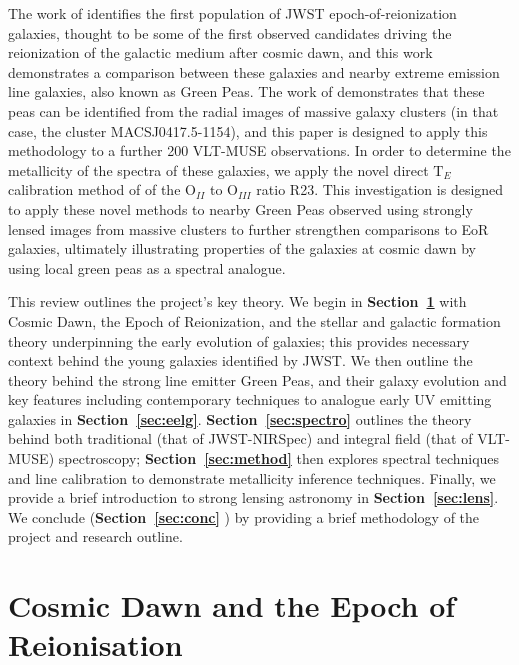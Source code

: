\documentclass[fleqn,usenatbib]{mnras}
\begin{document}
The work of \cite{Rhoads} identifies the first population of JWST epoch-of-reionization galaxies, thought to be some of the first observed candidates driving the reionization of the galactic medium after cosmic dawn, and this work demonstrates a comparison between these galaxies and nearby extreme emission line galaxies, also known as Green Peas. The work of \cite{jauzac} demonstrates that these peas can be identified from the radial images of massive galaxy clusters (in that case, the cluster MACSJ0417.5-1154), and this paper is designed to apply this methodology to a further 200 VLT-MUSE observations. In order to determine the metallicity of the spectra of these galaxies, we apply the novel direct $\mathrm{T}_E$ calibration method of \cite{jiang} of the O$_{II}$ to O$_{III}$ ratio R23. This investigation is designed to apply these novel methods to nearby Green Peas observed using strongly lensed images from massive clusters to further strengthen comparisons to EoR galaxies, ultimately illustrating properties of the galaxies at cosmic dawn by using local green peas as a spectral analogue. 

This review outlines the project’s key theory. We begin in \textbf{Section~\ref{sec:cdawn}} with Cosmic Dawn, the Epoch of Reionization, and the stellar and galactic formation theory underpinning the early evolution of galaxies; this provides necessary context behind the young galaxies identified by JWST. We then outline the theory behind the strong line emitter Green Peas, and their galaxy evolution and key features including contemporary techniques to analogue early UV emitting galaxies in \textbf{Section~\ref{sec:eelg}}. \textbf{Section~\ref{sec:spectro}} outlines the theory behind both traditional (that of JWST-NIRSpec) and integral field (that of VLT-MUSE) spectroscopy; \textbf{Section~\ref{sec:method}} then explores spectral techniques and line calibration to demonstrate metallicity inference techniques. Finally, we provide a brief introduction to strong lensing astronomy in \textbf{Section~\ref{sec:lens}}. We conclude (\textbf{Section~\ref{sec:conc}} ) by providing a brief methodology of the project and research outline.

\section{Cosmic Dawn and the Epoch of Reionisation}
\label{sec:cdawn}
\end{document}
